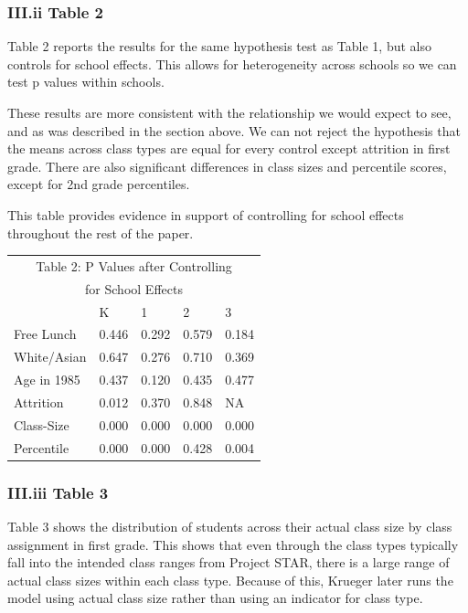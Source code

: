 \documentclass[a4paper,11pt]{article}
\begin{document}
\subsubsection*{III.ii Table 2}
Table 2 reports the results for the same hypothesis test as Table 1, but also controls for school effects. This allows for heterogeneity across schools so we can test p values within schools. \par
These results are more consistent with the relationship we would expect to see, and as was described in the section above. We can not reject the hypothesis that the means across class types are equal for every control except attrition in first grade. There are also significant differences in class sizes and percentile scores, except for 2nd grade percentiles.  \par
This table provides evidence in support of controlling for school effects throughout the rest of the paper. \par

\begin{table}[H]
\begin{center}	
\centering
	\begin{tabular}{ l | l  l  l  l } 
	\multicolumn{5}{c}{Table 2: P Values after Controlling} \\
	\multicolumn{5}{c}{for School Effects} \\ \hline \hline
	& K  & 1  & 2  & 3  \\  \hline 
	Free Lunch & 0.446 & 0.292 & 0.579 & 0.184 \\  
	White/Asian & 0.647 & 0.276 & 0.710 & 0.369 \\  
	Age in 1985 & 0.437 & 0.120 & 0.435 & 0.477 \\  
	Attrition & 0.012 & 0.370 & 0.848 & NA \\  
	Class-Size & 0.000 & 0.000 & 0.000 & 0.000 \\  
	Percentile & 0.000 & 0.000 & 0.428 & 0.004 \\  
	\hline \hline
\end{tabular}
\end{center}
\end{table}


\subsubsection*{III.iii Table 3}	
Table 3 shows the distribution of students across their actual class size by class assignment in first grade. This shows that even through the class types typically fall into the intended class ranges from Project STAR, there is a large range of actual class sizes within each class type. Because of this, Krueger later runs the model using actual class size rather than using an indicator for class type. 
\end{document}
